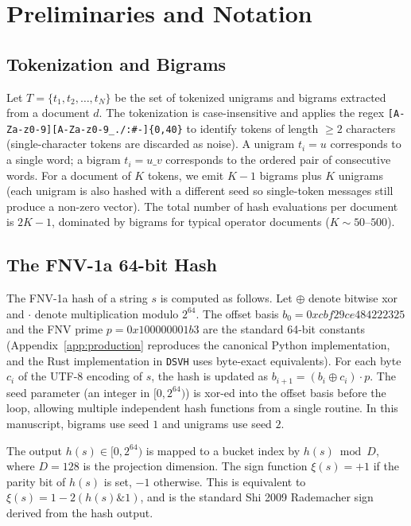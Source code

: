 \documentclass[10pt,twocolumn]{article}
\theoremstyle{definition}
\theoremstyle{remark}
\begin{document}
\section{Preliminaries and Notation}
\label{sec:preliminaries}

\subsection{Tokenization and Bigrams}

Let $T = \{t_1, t_2, \ldots, t_N\}$ be the set of tokenized unigrams and
bigrams extracted from a document $d$. The tokenization is case-insensitive
and applies the regex
\texttt{[A-Za-z0-9][A-Za-z0-9\_./:\#-]\{0,40\}} to identify tokens of
length $\ge 2$ characters (single-character tokens are discarded as
noise). A unigram $t_i = u$ corresponds to a single word; a bigram
$t_i = u\_v$ corresponds to the ordered pair of consecutive words. For
a document of $K$ tokens, we emit $K - 1$ bigrams plus $K$ unigrams (each
unigram is also hashed with a different seed so single-token messages
still produce a non-zero vector). The total number of hash evaluations per
document is $2K - 1$, dominated by bigrams for typical operator documents
($K \sim 50$--$500$).

\subsection{The FNV-1a 64-bit Hash}

The FNV-1a hash of a string $s$ is computed as follows. Let $\oplus$
denote bitwise xor and $\cdot$ denote multiplication modulo $2^{64}$.
The offset basis $b_0 = 0xcbf29ce484222325$ and the FNV prime $p =
0x100000001b3$ are the standard 64-bit constants
(Appendix~\ref{app:production} reproduces the canonical Python
implementation, and the Rust implementation in
\texttt{DSVH} uses byte-exact equivalents). For each
byte $c_i$ of the UTF-8 encoding of $s$, the hash is updated as
$b_{i+1} = (b_i \oplus c_i) \cdot p$. The seed parameter (an integer in
$[0, 2^{64})$) is xor-ed into the offset basis before the loop, allowing
multiple independent hash functions from a single routine. In this
manuscript, bigrams use seed $1$ and unigrams use seed $2$.

The output $h(s) \in [0, 2^{64})$ is mapped to a bucket index by
$h(s) \bmod D$, where $D = 128$ is the projection dimension. The sign
function $\xi(s) = +1$ if the parity bit of $h(s)$ is set, $-1$
otherwise. This is equivalent to $\xi(s) = 1 - 2(h(s) \& 1)$, and is the
standard Shi 2009 Rademacher sign derived from the hash output.
\end{document}
